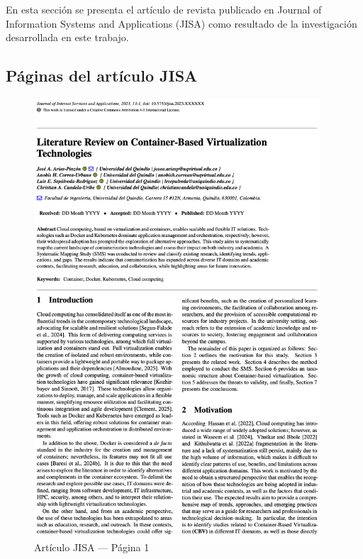 En esta sección se presenta el artículo de revista publicado en Journal of Information Systems and Applications (JISA) como resultado de la investigación desarrollada en este trabajo.

\subsection{Páginas del artículo JISA}

\begin{figure}[H]
    \centering
    \begin{tcolorbox}[
        colback=white,
        colframe=gray!50,
        boxrule=1pt,
        arc=2pt,
        boxsep=5pt,
        left=3pt,
        right=3pt,
        top=3pt,
        bottom=3pt,
        drop shadow
    ]
        \includegraphics[width=0.95\textwidth,keepaspectratio]{apendices/JISA/pagina_1.png}
    \end{tcolorbox}
    \caption{Artículo JISA --- Página 1}\label{fig:jisa-pagina-1}
\end{figure}
